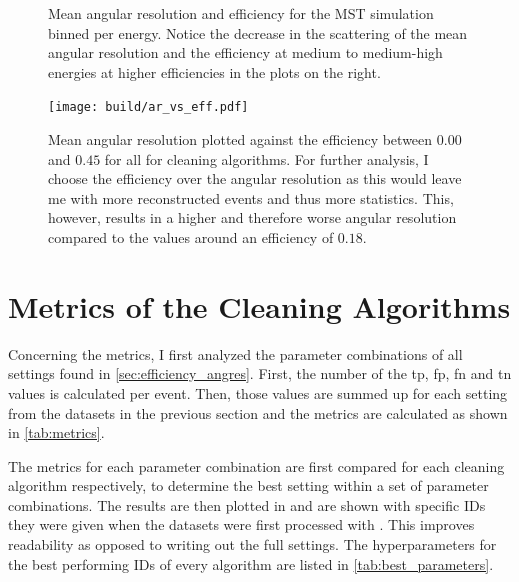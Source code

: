 \begin{figure}
\begin{subfigure}{0.48\textwidth}
    \end{subfigure}
    \caption{Mean angular resolution and efficiency for the MST simulation binned per energy. Notice
    the decrease in the scattering of the mean angular resolution and the efficiency at medium to
    medium-high energies at higher efficiencies in the plots on the right.\vspace{-0.5cm}}
    \label{fig:efficiency_angres}
\end{figure}
\begin{figure}[!htbp]
    \centering
    \texttt{[image: build/ar\_vs\_eff.pdf]}
    \caption{Mean angular resolution plotted against the efficiency between \(\num{0.00}\) and \(\num{0.45}\) for
    all for cleaning algorithms. For further analysis, I choose the efficiency over the angular resolution
    as this would leave me with more reconstructed events and thus more statistics. This, however, results in
    a higher and therefore worse angular resolution compared to \eg the values around an efficiency of \(0.18\).}
    \label{fig:ar_vs_eff}
\end{figure}


\section{Metrics of the Cleaning Algorithms}
\label{sec:metrics}
Concerning the metrics, I first analyzed the parameter combinations of all settings found in \autoref{sec:efficiency_angres}. First,
the number of the \gls{tp}, \gls{fp}, \gls{fn} and \gls{tn} values is calculated per event. Then,
those values are summed up for each setting from the datasets in the previous section and the metrics are calculated as shown in
\autoref{tab:metrics}.

The metrics for each parameter combination are first compared for each cleaning algorithm respectively,
to determine the best setting within a set of parameter combinations. The results are then plotted in
and are shown with specific IDs they were given when the datasets were first processed with \ctapipe.
This improves readability as opposed to writing out the full settings. The hyperparameters for the best performing
IDs of every algorithm are listed in \autoref{tab:best_parameters}.

